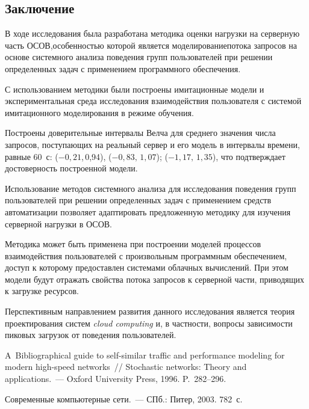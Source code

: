 \begin{multicols}{2}
\section{Заключение}
  
  В ходе исследования была разработана методика оценки нагрузки на серверную 
часть ОСОВ,\linebreak особенностью которой является 
моделирование\linebreak потока запросов на основе системного анализа поведения групп 
пользователей при решении определенных задач с применением программного 
обеспечения. 
  
  С использованием методики были построены имитационные модели и 
экспериментальная среда исследования взаимодействия пользователя с сис\-те\-мой 
имитационного моделирования в режиме обучения. 
  
  Построены доверительные интервалы Велча для среднего значения числа 
запросов, поступающих на реальный сервер и его модель в интервалы времени, 
равные 60~с: ($-0{,}21$,\,0,94), ($-0{,}83,\,1,07$); ($-1{,}17,\,1,35$), что 
подтверждает достоверность построенной модели.
  
  Использование методов системного анализа для исследования поведения групп 
пользователей при решении определенных задач с применением средств 
автоматизации позволяет адаптировать предложенную методику для изучения 
серверной нагрузки в ОСОВ.
  
  Методика может быть применена при построении моделей процессов 
взаимодействия пользователей с произвольным программным обеспечением, 
доступ к которому предоставлен системами облачных вычислений. При этом 
модели будут отражать свойства потока запросов к серверной части, приводящих 
к загрузке ресурсов.
  
  Перспективным направлением развития данного исследования является теория 
проектирования систем \textit{cloud computing} и, в частности, вопросы 
зависимости пиковых загрузок от поведения пользователей.

{\small\frenchspacing
{%
\begin{thebibliography}{9}

A~Bibliographical guide to self-similar traffic and performance modeling for 
modern high-speed networks~// Stochastic networks: Theory and applications.~--- 
Oxford University Press, 1996. P.~282--296.

 Современные компьютерные сети.~--- СПб.: Питер, 2003. 
782~с.


\end{thebibliography}}}
\end{multicols}
